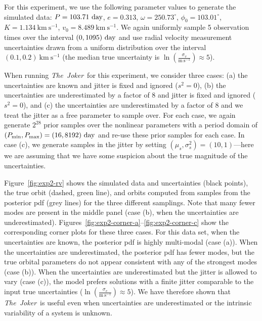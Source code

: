 \documentclass[manuscript, letterpaper]{aastex6}
\newcommand{\project}[1]{\textsl{#1}}
\newcommand{\samplername}{\project{The~Joker}}
\newcommand{\figname}{Figure}
\newcommand{\kms}{\mathrm{km}~\mathrm{s}^{-1}}
\newcommand{\mps}{\mathrm{m}~\mathrm{s}^{-1}}
\begin{document}
For this experiment, we use the following parameter values to generate the
simulated data: $P = 103.71~{\rm day}$, $e = 0.313$, $\omega = 250.73^\circ$,
$\phi_0 = 103.01^\circ$, $K = 1.134~\kms$, $v_0 = 8.489~\kms$.
We again uniformly sample 5 observation times over the interval $(0,1095)~{\rm
day}$ and use radial velocity measurement uncertainties drawn from a uniform
distribution over the interval $(0.1, 0.2)~\kms$ (the median true uncertainty is
$\ln \left(\frac{\sigma_v}{\mps}\right) \approx 5$).

When running \samplername\ for this experiment, we consider three cases:
(a) the uncertainties are known and jitter is fixed and ignored ($s^2=0$), (b)
the uncertainties are underestimated by a factor of 8 and jitter is fixed and
ignored ($s^2=0$), and (c) the uncertainties are underestimated by a factor of 8
and we treat the jitter as a free parameter to sample over.
For each case, we again generate $2^{28}$ prior samples over the nonlinear
parameters with a period domain of $(P_{\rm min}, P_{\rm max}) = (16, 8192)~{\rm
day}$ and re-use these prior samples for each case.
In case (c), we generate samples in the jitter by setting
$(\mu_s,\sigma^2_s) = (10,1)$---here we are assuming that we have some suspicion
about the true magnitude of the uncertainties.

\figname~\ref{fig:exp2-rv} shows the simulated data and uncertainties (black
points), the true orbit (dashed, green line), and orbits computed from samples
from the posterior pdf (grey lines) for the three different samplings.
Note that many fewer modes are present in the middle panel (case (b), when the
uncertainties are underestimated).
\figname s~\ref{fig:exp2-corner-a}--\ref{fig:exp2-corner-c} show the
corresponding corner plots for these three cases.
For this data set, when the uncertainties are known, the posterior pdf is highly
multi-modal (case (a)).
When the uncertainties are underestimated, the posterior pdf has fewer modes,
but the true orbital parameters do not appear consistent with any of the
strongest modes (case (b)).
When the uncertainties are underestimated but the jitter is allowed to vary
(case (c)), the model prefers solutions with a finite jitter comparable to the
input true uncertainties ($\ln \left(\frac{\sigma_v}{\mps}\right) \approx 5$).
We have therefore shown that \samplername\ is useful even when uncertainties are
underestimated or the intrinsic variability of a system is unknown.
\end{document}
